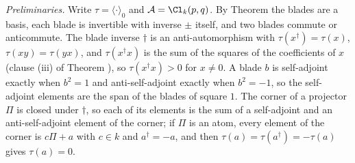 \emph{Preliminaries.} Write $\tau = \langle\cdot\rangle_{0}$ and $\mathcal{A} = \Cl_{k}(p,q)$. By Theorem  the blades are a basis, each blade is invertible with inverse $\pm$ itself, and two blades commute or anticommute. The blade inverse $\dagger$ is an anti-automorphism with $\tau(x^{\dagger}) = \tau(x)$, $\tau(xy) = \tau(yx)$, and $\tau(x^{\dagger}x)$ is the sum of the squares of the coefficients of $x$ (clause (iii) of Theorem ), so $\tau(x^{\dagger}x) > 0$ for $x \ne 0$. A blade $b$ is self-adjoint exactly when $b^{2} = 1$ and anti-self-adjoint exactly when $b^{2} = -1$, so the self-adjoint elements are the span of the blades of square $1$. The corner of a projector $\Pi$ is closed under $\dagger$, so each of its elements is the sum of a self-adjoint and an anti-self-adjoint element of the corner; if $\Pi$ is an atom, every element of the corner is $c\Pi + a$ with $c \in k$ and $a^{\dagger} = -a$, and then $\tau(a) = \tau(a^{\dagger}) = -\tau(a)$ gives $\tau(a) = 0$.

